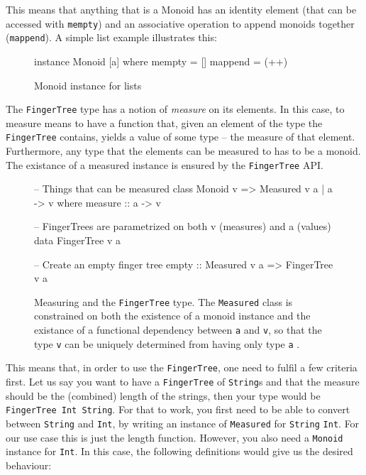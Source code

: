 \documentclass[a4paper,12pt,twosided]{report}
\renewcommand\cite{\citep}
\begin{document}
This means that anything that is a Monoid has an identity element (that can be
accessed with \texttt{mempty}) and an associative operation to append monoids
together (\texttt{mappend}). A simple list example illustrates this:

\begin{figure}[H]
\begin{code}
instance Monoid [a] where
    mempty = []
    mappend = (++)
\end{code}
\caption{Monoid instance for lists}
\end{figure}

The \texttt{FingerTree} type has a notion of \textit{measure} on its elements.
In this case, to measure means to have a function that, given an element of the
type the \texttt{FingerTree} contains, yields a value of some type -- the
measure of that element. Furthermore, any type that the elements can be measured
to has to be a monoid. The existance of a measured instance is ensured by the
\texttt{FingerTree} API. 

\begin{figure}[H]
\begin{code}
-- Things that can be measured
class Monoid v => Measured v a | a -> v where
    measure :: a -> v

-- FingerTrees are parametrized on both v (measures) and a (values)
data FingerTree v a

-- Create an empty finger tree
empty :: Measured v a => FingerTree v a
\end{code}
\caption{Measuring and the \texttt{FingerTree} type. The \texttt{Measured} class
is constrained on both the existence of a monoid instance and the existance of a
functional dependency between \texttt{a} and \texttt{v}, so that the type
\texttt{v} can be uniquely determined from having only type \texttt{a}
\cite{fundeps}.} 
\end{figure}

This means that, in order to use the \texttt{FingerTree}, one need to fulfil a
few criteria first. Let us say you want to have a \texttt{FingerTree} of
\texttt{String}s and that the measure should be the (combined) length of the
strings, then your type would be \texttt{FingerTree Int String}. For that to
work, you first need to be able to convert between \texttt{String} and
\texttt{Int}, by writing an instance of \texttt{Measured} for \texttt{String}
\texttt{Int}. For our use case this is just the length function. However, you
also need a \texttt{Monoid} instance for \texttt{Int}. In this case, the
following definitions would give us the desired behaviour:
\end{document}
